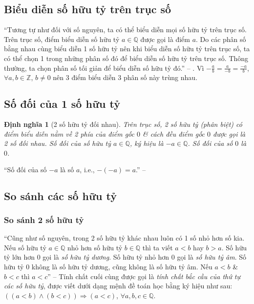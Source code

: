\documentclass[oneside]{book}
\numberwithin{equation}{section}
\newtheorem{dinhnghia}{Định nghĩa}[section]
\begin{document}
\subsection{Biểu diễn số hữu tỷ trên trục số}
``Tương tự như đối với số nguyên, ta có thể biểu diễn mọi số hữu tỷ trên trục số. Trên trục số, điểm biểu diễn số hữu tỷ $a\in\mathbb{Q}$ được gọi là điểm $a$. Do các phân số bằng nhau cùng biểu diễn 1 số hữu tỷ nên khi biểu diễn số hữu tỷ trên trục số, ta có thể chọn 1 trong những phân số đó để biểu diễn số hữu tỷ trên trục số. Thông thường, ta chọn phân số tối giản để biểu diễn số hữu tỷ đó.'' -- \cite[p. 6]{SGK_Toan_7_Canh_Dieu_tap_1}. Vì $-\frac{a}{b} = \frac{a}{-b} = \frac{-a}{b}$, $\forall a,b\in\mathbb{Z}$, $b\ne 0$ nên 3 điểm biểu diễn 3 phân số này trùng nhau.

\subsection{Số đối của 1 số hữu tỷ}

\begin{dinhnghia}[2 số hữu tỷ đối nhau]
	Trên trục số, 2 số hữu tỷ (phân biệt) có điểm biểu diễn nằm về 2 phía của điểm gốc $0$ \& cách đều điểm gốc $0$ được gọi là \emph{2 số đối nhau}. Số đối của số hữu tỷ $a\in\mathbb{Q}$, ký hiệu là $-a\in\mathbb{Q}$. Số đối của số $0$ là $0$.
\end{dinhnghia}
``Số đối của số $-a$ là số $a$, i.e., $-(-a) = a$.'' -- \cite[p. 8]{SGK_Toan_7_Canh_Dieu_tap_1}

\subsection{So sánh các số hữu tỷ}

\subsubsection{So sánh 2 số hữu tỷ}
``Cũng như số nguyên, trong 2 số hữu tỷ khác nhau luôn có 1 số nhỏ hơn số kia. Nếu số hữu tỷ $a\in\mathbb{Q}$ nhỏ hơn số hữu tỷ $b\in\mathbb{Q}$ thì ta viết $a < b$ hay $b > a$. Số hữu tỷ lớn hơn $0$ gọi là \emph{số hữu tỷ dương}. Số hữu tỷ nhỏ hơn $0$ gọi là \emph{số hữu tỷ âm}. Số hữu tỷ $0$ không là số hữu tỷ dương, cũng không là số hữu tỷ âm. Nếu $a < b$ \& $b < c$ thì $a < c$'' -- \cite[p. 8]{SGK_Toan_7_Canh_Dieu_tap_1} Tính chất cuối cùng được gọi là \textit{tính chất bắc cầu của thứ tự các số hữu tỷ}, được viết dưới dạng mệnh đề toán học bằng ký hiệu như sau: $((a < b)\land(b < c))\Rightarrow(a < c)$, $\forall a,b,c\in\mathbb{Q}$.
\end{document}
